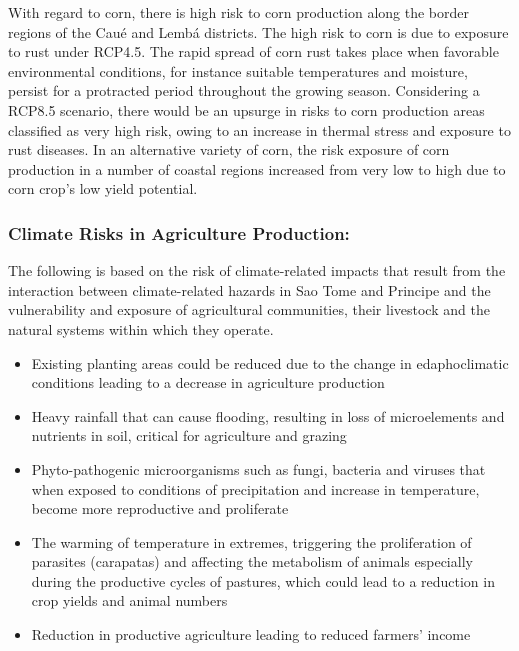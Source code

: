 \documentclass[
]{book}
\providecommand{\tightlist}{%
  \setlength{\itemsep}{0pt}\setlength{\parskip}{0pt}}
\begin{document}
With regard to corn, there is high risk to corn production along the border regions of the Caué and Lembá districts. The high risk to corn is due to exposure to rust under RCP4.5. The rapid spread of corn rust takes place when favorable environmental conditions, for instance suitable temperatures and moisture, persist for a protracted period throughout the growing season. Considering a RCP8.5 scenario, there would be an upsurge in risks to corn production areas classified as very high risk, owing to an increase in thermal stress and exposure to rust diseases. In an alternative variety of corn, the risk exposure of corn production in a number of coastal regions increased from very low to high due to corn crop's low yield potential.

\hypertarget{climate-risks-in-agriculture-production}{%
\subsubsection{Climate Risks in Agriculture Production:}\label{climate-risks-in-agriculture-production}}

The following is based on the risk of climate-related impacts that result from the interaction between climate-related hazards in Sao Tome and Principe and the vulnerability and exposure of agricultural communities, their livestock and the natural systems within which they operate.

\begin{itemize}
\tightlist
\item
  Existing planting areas could be reduced due to the change in edaphoclimatic conditions leading to a decrease in agriculture production
\item
  Heavy rainfall that can cause flooding, resulting in loss of microelements and nutrients in soil, critical for agriculture and grazing
\item
  Phyto-pathogenic microorganisms such as fungi, bacteria and viruses that when exposed to conditions of precipitation and increase in temperature, become more reproductive and proliferate
\item
  The warming of temperature in extremes, triggering the proliferation of parasites (carapatas) and affecting the metabolism of animals especially during the productive cycles of pastures, which could lead to a reduction in crop yields and animal numbers
\item
  Reduction in productive agriculture leading to reduced farmers' income
\end{itemize}
\end{document}
